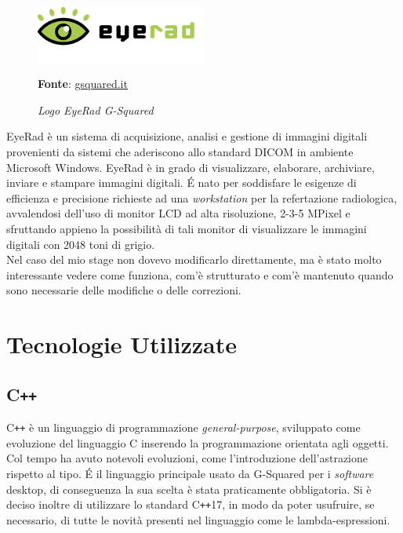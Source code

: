 \begin{figure}[h]
    \centering
    \includegraphics[width=0.5\textwidth]{immagini/logo-software-eyerad.png}
    \caption{\textit{Logo EyeRad G-Squared}}
    \textbf{Fonte}: \href{https://www.gsquared.it/it/pacs-ris-web-gateway-dicom-ihe-2/software-immagini-medicali/12-eyerad-refertazione-digitale}{gsquared.it}
    \label{fig: Logo software EyeRad G-Squared}
\end{figure}

EyeRad è un sistema di acquisizione, analisi e gestione di immagini digitali provenienti da sistemi che aderiscono allo standard DICOM in ambiente Microsoft Windows.
EyeRad è in grado di visualizzare, elaborare, archiviare, inviare e stampare immagini digitali.
\'E nato per soddisfare le esigenze di efficienza e precisione richieste ad una \emph{workstation} per la refertazione radiologica, avvalendosi dell'uso di monitor LCD ad alta risoluzione, 2-3-5 MPixel e sfruttando appieno la possibilità di tali monitor di visualizzare le immagini digitali con 2048 toni di grigio.
\\
Nel caso del mio stage non dovevo modificarlo direttamente, ma è stato molto interessante vedere come funziona, com'è strutturato e com'è mantenuto quando sono necessarie delle modifiche o delle correzioni.

\section{Tecnologie Utilizzate}
\subsection{C\texttt{++}}\label{sec:C++}
C\texttt{++} è un linguaggio di programmazione \emph{general-purpose}, sviluppato come evoluzione del linguaggio C inserendo la programmazione orientata agli oggetti. Col tempo ha avuto notevoli evoluzioni, come l'introduzione dell'astrazione rispetto al tipo. \'E il linguaggio principale usato da G-Squared per i \emph{software} desktop, di conseguenza la sua scelta è stata praticamente obbligatoria. Si è deciso inoltre di utilizzare lo standard C\texttt{++}17, in modo da poter usufruire, se necessario, di tutte le novità presenti nel linguaggio come le lambda-espressioni.

